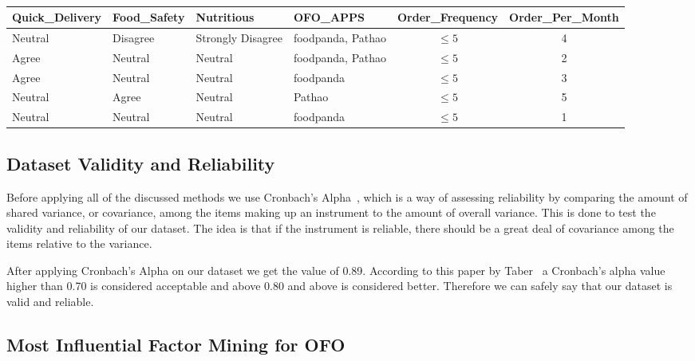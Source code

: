 \documentclass[a4paper,fleqn]{cas-sc}
\begin{document}
\begin{table}[htbp]
    \vspace{1em} %

    \begin{subtable}{\textwidth}
        \centering
        \begin{tabular*}{\linewidth}{@{\extracolsep{\fill}}llllcc@{}}
            \toprule
            Quick\_Delivery & Food\_Safety & Nutritious & OFO\_APPS & Order\_Frequency & Order\_Per\_Month \\
            \midrule
            Neutral & Disagree & Strongly Disagree & foodpanda, Pathao & $\leq 5$ & 4 \\
            Agree & Neutral & Neutral & foodpanda, Pathao & $\leq 5$ & 2 \\
            Agree & Neutral & Neutral & foodpanda & $\leq 5$ & 3 \\
            Neutral & Agree & Neutral & Pathao & $\leq 5$ & 5 \\
            Neutral & Neutral & Neutral & foodpanda & $\leq 5$ & 1 \\
            \bottomrule
        \end{tabular*}
        \caption{}
        \label{tab:sample_5}
    \end{subtable}
\end{table}

\subsection{Dataset Validity and Reliability}

Before applying all of the discussed methods we use Cronbach's Alpha~\cite{chronbach}, which is a way of assessing reliability by comparing the amount of shared variance, or covariance, among the items making up an instrument to the amount of overall variance. This is done to test the validity and reliability of our dataset. The idea is that if the instrument is reliable, there should be a great deal of covariance among the items relative to the variance. 

After applying Cronbach's Alpha on our dataset we get the value of 0.89. According to this paper by Taber~\cite{taber_2017} a Cronbach's alpha value higher than 0.70 is considered acceptable and above 0.80 and above is considered better. Therefore we can safely say that our dataset is valid and reliable. 

\subsection{Most Influential Factor Mining for OFO}
\end{document}
